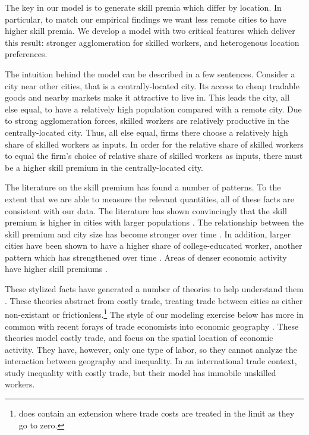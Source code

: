 \documentclass{article}
\begin{document}
The key in our model is to generate skill premia which differ by location.  In particular, to match our empirical findings we want less remote cities to have higher skill premia.  We develop a model with two critical features which deliver this result: stronger agglomeration for skilled workers, and heterogenous location preferences. 

The intuition behind the model can be described in a few sentences.  Consider a city near other cities, that is a centrally-located city.  Its access to cheap tradable goods and nearby markets make it attractive to live in.  This leads the city, all else equal, to have a relatively high population compared with a remote city.  Due to strong agglomeration forces, skilled workers are relatively productive in the centrally-located city.  Thus, all else equal, firms there choose a relatively high share of skilled workers as inputs.  In order for the relative share of skilled workers to equal the firm's choice of relative share of skilled workers as inputs, there must be a higher skill premium in the centrally-located city.

The literature on the skill premium has found a number of patterns.  To the extent that we are able to measure the relevant quantities, all of these facts are consistent with our data.  The literature has shown convincingly that the skill premium is higher in cities with larger populations \citep{davis2012spatial}.  The relationship between the skill premium and city size has become stronger over time \citep{baum2013inequality, lindley2014spatial}.  In addition, larger cities have been shown to have a higher share of college-educated worker, another pattern which has strengthened over time \citep{moretti2008real, lindley2014spatial}.  Areas of denser economic activity have higher skill premiums \citep{combes2012sorting}.

These stylized facts have generated a number of theories to help understand them \citep{davis2012spatial,davis2014comparative,baum2012understanding,combes2012sorting}.  These theories abstract from costly trade, treating trade between cities as either non-existant or frictionless.\footnote{\citet{davis2012spatial} does contain an extension where trade costs are treated in the limit as they go to zero.}  The style of our modeling exercise below has more in common with recent forays of trade economists into economic geography \citep{allen2014trade,desmet2014geography,fajgelbaum2015state}.  These theories model costly trade, and focus on the spatial location of economic activity. They have, however, only one type of labor, so they cannot analyze the interaction between geography and inequality.  In an international trade context, \citet{fujita2006globalization} study inequality with costly trade, but their model has immobile unskilled workers.  
\end{document}
